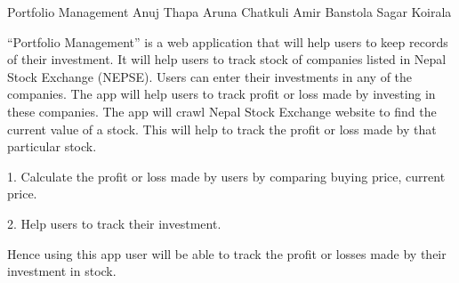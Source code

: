  \begin{conf-abstract}[]
 {Portfolio Management}
 { Anuj Thapa
 	Aruna Chatkuli
 	Amir Banstola
 	Sagar Koirala
 }
{}

“Portfolio Management” is a web application that will help users to keep
records of their investment. It will help users to track stock of companies listed in Nepal Stock Exchange (NEPSE). Users can enter their investments in any of the companies. The app will help users to track profit or loss made by investing in these companies. The app will crawl Nepal Stock Exchange website to find the current value of a stock. This will help to track the profit or loss made by that particular stock.

1. Calculate the profit or loss made by users by comparing buying
price, current price.

2. Help users to track their investment.

Hence using this app user will be able to track the profit or losses made by their investment in stock.
\end{conf-abstract}
